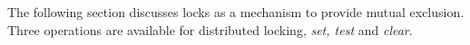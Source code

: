 The following section discusses \openshmem locks as a mechanism to provide mutual exclusion. Three operations are available for distributed locking, 
\textit{set, test} and  \textit{clear}.